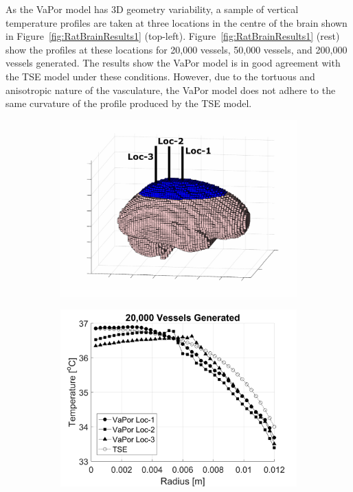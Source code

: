 \documentclass[11pt,english,a4paper,twoside,openright]{report}
\begin{document}
{{{{{{{As the VaPor model has 3D geometry variability, a sample of vertical temperature profiles are taken at three locations in the centre of the brain shown in Figure~\ref{fig:RatBrainResults1} (top-left). Figure~\ref{fig:RatBrainResults1} (rest) show the profiles at these locations for 20,000 vessels, 50,000 vessels, and 200,000 vessels generated. The results show the VaPor model is in good agreement with the TSE model under these conditions. However, due to the tortuous and anisotropic nature of the vasculature, the VaPor model does not adhere to the same curvature of the profile produced by the TSE model. 

\begin{figure}[h]
	\centering
	\begin{subfigure}[b]{0.49\textwidth}
		\includegraphics[width=\textwidth]{Chapter5/Chapter5_RatBrainDiagram}
	\end{subfigure}
	\begin{subfigure}[b]{0.49\textwidth}
		\includegraphics[width=\textwidth]{Chapter5/Chapter5_RatBrain_20000}

\end{subfigure}
\end{figure}}}}}}}}
\end{document}
